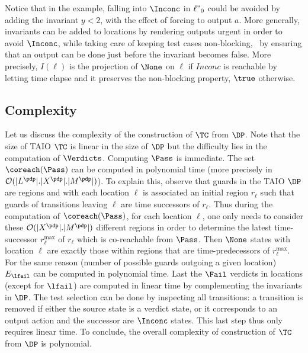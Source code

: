 \documentclass{LMCS}
\theoremstyle{plain}\newtheorem{proposition}[thm]{Proposition}
\begin{document}
\begin{rem}
Notice that in the example, falling into $\Inconc$ in  
$\ell"_0$ could be avoided by adding the invariant $y<2$,
with the effect of forcing to output $a$.
More generally, invariants can be added to locations by rendering outputs 
urgent 
in order to avoid $\Inconc$, while taking care of keeping test cases non-blocking, \ie\ by ensuring that an output can be done just before the invariant becomes false.
More precisely, $I(\ell)$ is the projection of $\None$ on $\ell$ if 
$Inconc$ is reachable by letting time elapse and it preserves the non-blocking
property, $\true$ otherwise.
\end{rem}



\subsection*{Complexity}
Let us discuss the complexity of the construction of $\TC$ from
  $\DP$. Note that the size of TAIO $\TC$ is linear in the size of
  $\DP$ but the difficulty lies in the computation of
  $\Verdicts$. Computing $\Pass$ is immediate. 
The set $\coreach(\Pass)$ can be computed in polynomial time (more
  precisely in $\mathcal{O}(|L^\pdp| . |X^\pdp| . |M^\pdp|) $). To
  explain this, observe that guards in the TAIO $\DP$ are regions and
  with each location $\ell$ is associated an initial region $r_\ell$
  such that guards of transitions leaving $\ell$ are time successors of
  $r_\ell$. Thus during the computation of $\coreach(\Pass)$, for each
  location $\ell$, one only needs to consider these $ \mathcal{O}(
  |X^\pdp| . |M^\pdp|)$ different regions in order to determine the
  latest time-successor $r_\ell^{\max}$ of $r_\ell$ which is
  co-reachable from $\Pass$. Then $\None$ states with location $\ell$
  are exactly those within regions that are time-predecessors of
  $r_\ell^{\max}$. For the same reason (number of possible guards
  outgoing a given location) $E_{\lfail}$ can be computed in
  polynomial time. Last the $\Fail$ verdicts in locations (except for
  $\lfail$) are computed in linear time by complementing the
  invariants in $\DP$.
The test selection can be done by inspecting all transitions: a
  transition is removed if either the source state is a verdict state,
  or it corresponds to an output action and the successor are
  $\Inconc$ states. This last step thus only requires linear time.
To conclude, the overall complexity of construction of $\TC$ from
  $\DP$ is polynomial.  
\end{document}
